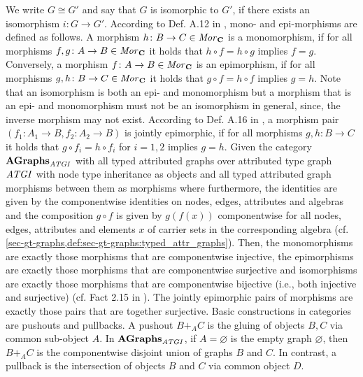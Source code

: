 \begin{remark}
We write $G \cong G'$ and say that $G$ is isomorphic to $G'$, if there exists an isomorphism $i\colon G \to G'$.
According to Def. A.12 in \cite{Ehrig:2006:FAG:1121741}, mono- and epi-morphisms are defined as follows.
A morphism $h\colon B \to C \in \mathit{Mor}_\mathbf{C}$ is a monomorphism, if for all morphisms $f,g\colon A \to B \in \mathit{Mor}_\mathbf{C}$ it holds that $h \circ f=h \circ g$ implies $f=g$.
Conversely, a morphism $f\colon A \to B \in \mathit{Mor}_\mathbf{C}$ is an epimorphism, if for all morphisms $g,h\colon B \to C \in \mathit{Mor}_\mathbf{C}$ it holds that $g \circ f=h \circ f$ implies $g=h$.
Note that an isomorphism is both an epi- and monomorphism but a morphism that is an epi- and monomorphism must not be an isomorphism in general, since, the inverse morphism may not exist.
According to Def. A.16 in \cite{FAGT2}, a morphism pair $(f_1\colon A_1 \to B,f_2\colon A_2 \to B)$ is jointly epimorphic, if for all morphisms $g,h\colon B \to C$ it holds that $g \circ f_i=h \circ f_i$ for $i=1,2$ implies $g=h$.
Given the category $\mathbf{AGraphs}_\mathit{ATGI}$ with all typed attributed graphs over attributed type graph $\mathit{ATGI}$ with node type inheritance as objects and all typed attributed graph morphisms between them as morphisms where furthermore, the identities are given by the componentwise identities on nodes, edges, attributes and algebras and the composition $g \circ f$ is given by $g(f(x))$ componentwise for all nodes, edges, attributes and elements $x$ of carrier sets in the corresponding algebra (cf. \cref{sec-gt-graphs,def:sec-gt-graphs:typed_attr_graphs}).
Then, the monomorphisms are exactly those morphisms that are componentwise injective, the epimorphisms are exactly those morphisms that are componentwise surjective and isomorphisms are exactly those morphisms that are componentwise bijective (i.e., both injective and surjective) (cf. Fact 2.15 in \cite{Ehrig:2006:FAG:1121741}).
The jointly epimorphic pairs of morphisms are exactly those pairs that are together surjective.
Basic constructions in categories are pushouts and pullbacks.
A pushout $B +_A C$ is the gluing of objects $B,C$ via common sub-object $A$.
In $\mathbf{AGraphs}_\mathit{ATGI}$, if $A=\varnothing$ is the empty graph $\varnothing$, then $B +_A C$ is the componentwise disjoint union of graphs $B$ and $C$.
In contrast, a pullback is the intersection of objects $B$ and $C$ via common object $D$.
\parpic[r][r]{
}
\end{remark}
